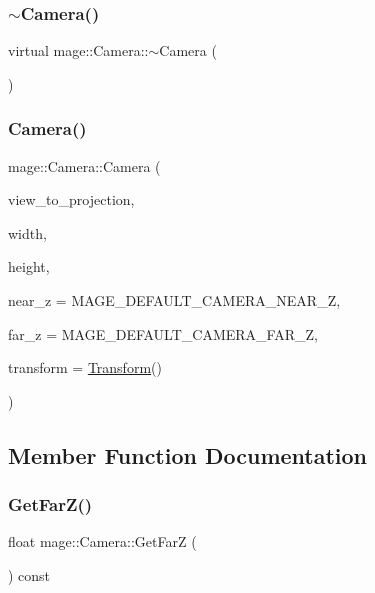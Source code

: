 \subsubsection{\texorpdfstring{$\sim$\+Camera()}{~Camera()}}
{\footnotesize\ttfamily virtual mage\+::\+Camera\+::$\sim$\+Camera (\begin{DoxyParamCaption}{ }\end{DoxyParamCaption})\hspace{0.3cm}{\ttfamily [virtual]}}

\hypertarget{classmage_1_1_camera_a21ce33c0d4f4e3fb2cbbd9ba8d024a23}{}\label{classmage_1_1_camera_a21ce33c0d4f4e3fb2cbbd9ba8d024a23} 
\subsubsection{\texorpdfstring{Camera()}{Camera()}}
{\footnotesize\ttfamily mage\+::\+Camera\+::\+Camera (\begin{DoxyParamCaption}\item[{const X\+M\+M\+A\+T\+R\+IX \&}]{view\+\_\+to\+\_\+projection,  }\item[{float}]{width,  }\item[{float}]{height,  }\item[{float}]{near\+\_\+z = {\ttfamily MAGE\+\_\+DEFAULT\+\_\+CAMERA\+\_\+NEAR\+\_\+Z},  }\item[{float}]{far\+\_\+z = {\ttfamily MAGE\+\_\+DEFAULT\+\_\+CAMERA\+\_\+FAR\+\_\+Z},  }\item[{const \hyperlink{structmage_1_1_transform}{Transform} \&}]{transform = {\ttfamily \hyperlink{structmage_1_1_transform}{Transform}()} }\end{DoxyParamCaption})\hspace{0.3cm}{\ttfamily [protected]}}



\subsection{Member Function Documentation}
\hypertarget{classmage_1_1_camera_a7f293a8711086b3419fe3b4224ff2778}{}\label{classmage_1_1_camera_a7f293a8711086b3419fe3b4224ff2778} 
\subsubsection{\texorpdfstring{Get\+Far\+Z()}{GetFarZ()}}
{\footnotesize\ttfamily float mage\+::\+Camera\+::\+Get\+FarZ (\begin{DoxyParamCaption}{ }\end{DoxyParamCaption}) const}


